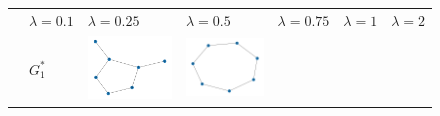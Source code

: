 \documentclass[11pt,a4paper,openright,oneside]{book}
\numberwithin{equation}{section}
\begin{document}
{\begin{figure}[H]
\begin{adjustwidth}{-3cm}{-3cm}
    \centering
    \begin{tabular}{>{\centering\arraybackslash}m{1.5cm}| m{2.5cm} |m{2.5cm} |m{2.5cm} |m{2.5cm} |m{2.5cm} |m{2.5cm}}
        & \centering $\lambda = 0.1$ & \centering $\lambda = 0.25$ & \centering $\lambda = 0.5$ & \centering $\lambda = 0.75$ & \centering $\lambda = 1$ & \centering $\lambda = 2$ 
        \\
        & $G_1^*$ &
        \includegraphics[width=\linewidth]{media/nn/graph-0.1-tnale-0.1-RR1.png} &
        \includegraphics[width=\linewidth]{media/nn/graph-0.25-tnale-0.25-RR1.png} &

\end{tabular}
\end{adjustwidth}
\end{figure}}
\end{document}
